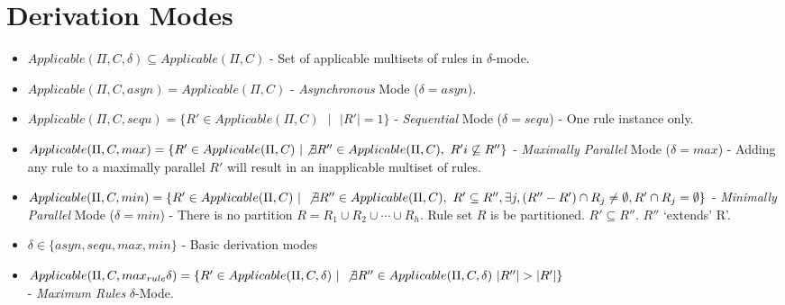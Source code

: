 \documentclass[a4paper]{article}
\theoremstyle{definition}
\newcommand{\ts}{\text{ }}
\begin{document}
\section{Derivation Modes}\label{app-derivation}

\cite{freund-2007-ff-1}

\begin{itemize}                                                                                       
   \item $Applicable(\Pi, C, \delta) \subseteq Applicable(\Pi, C)$ - Set of applicable multisets of 
         rules in $\delta$-mode.                                                                                 
   \item $Applicable(\Pi, C, asyn) = Applicable(\Pi, C)$ - \textit{Asynchronous} Mode ($\delta = 
         asyn$).            
   \item $Applicable(\Pi, C, sequ) = \{R' \in Applicable(\Pi, C) \ts | \ts |R'|=1\}$ - 
         \textit{Sequential} Mode ($\delta = sequ$) - One rule instance only.                                                         
   \item $Applicable(\Pi, C, max) = \{R' \in Applicable(\Pi, C) \ts | \not\exists R'' \in Applicable(\Pi, C), \ts R' i   
         \not\subseteq R'' \}$ - \textit{Maximally Parallel} Mode ($\delta = max$) - Adding any rule 
         to a maximally parallel $R'$ will result in an inapplicable multiset of rules.                 
   \item $Applicable(\Pi, C, min) = \{R' \in Applicable(\Pi, C) \ts | \ts \not\exists R'' \in Applicable(\Pi,C), \ts R'   
         \subseteq R'', \exists j, (R''-R') \cap R_j \neq \emptyset, R' \cap R_j = \emptyset\}$                                                                                              
         - \textit{Minimally Parallel} Mode ($\delta = min$) - There is no partition                    
          $R = R_1 \cup R_2 \cup \cdots \cup R_h$. Rule set $R$ is be partitioned.                      
          $R' \subseteq R''$. $R''$ `extends' R'.                                                       
   \item $\delta \in \{asyn, sequ, max, min\}$ - Basic derivation modes                                 
   \item $Applicable(\Pi, C, max_{rule}\delta) = \{R' \in Applicable(\Pi, C, \delta) \ts | \ts \not\exists R''        
         \in Applicable(\Pi,C, \delta) \ts |R''| > |R'|\}$\\ - \textit{Maximum Rules} $\delta$-Mode.           

\end{itemize}
\end{document}
